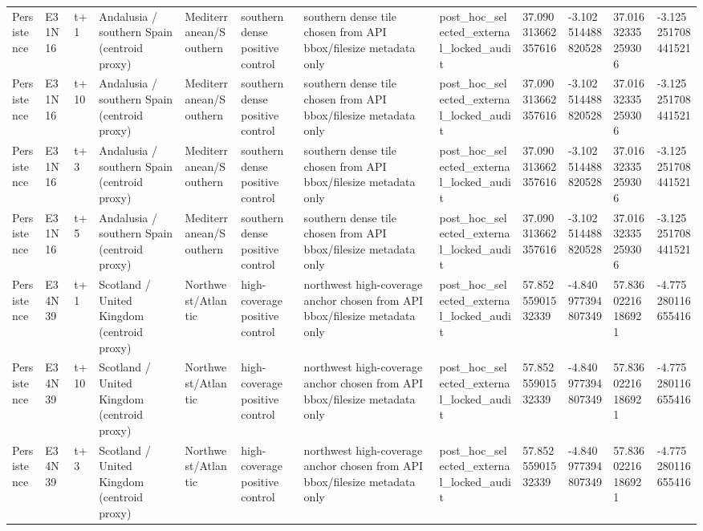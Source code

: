 \begin{landscape}
\begin{longtable}{llllllllllll}
Persistence & E31N16 & t+1 & Andalusia / southern Spain (centroid proxy) & Mediterranean/Southern & southern dense positive control & southern dense tile chosen from API bbox/filesize metadata only & post\_hoc\_selected\_external\_locked\_audit & 37.090313662357616 & -3.102514488820528 & 37.01632335259306 & -3.125251708441521 \\
Persistence & E31N16 & t+10 & Andalusia / southern Spain (centroid proxy) & Mediterranean/Southern & southern dense positive control & southern dense tile chosen from API bbox/filesize metadata only & post\_hoc\_selected\_external\_locked\_audit & 37.090313662357616 & -3.102514488820528 & 37.01632335259306 & -3.125251708441521 \\
Persistence & E31N16 & t+3 & Andalusia / southern Spain (centroid proxy) & Mediterranean/Southern & southern dense positive control & southern dense tile chosen from API bbox/filesize metadata only & post\_hoc\_selected\_external\_locked\_audit & 37.090313662357616 & -3.102514488820528 & 37.01632335259306 & -3.125251708441521 \\
Persistence & E31N16 & t+5 & Andalusia / southern Spain (centroid proxy) & Mediterranean/Southern & southern dense positive control & southern dense tile chosen from API bbox/filesize metadata only & post\_hoc\_selected\_external\_locked\_audit & 37.090313662357616 & -3.102514488820528 & 37.01632335259306 & -3.125251708441521 \\
Persistence & E34N39 & t+1 & Scotland / United Kingdom (centroid proxy) & Northwest/Atlantic & high-coverage positive control & northwest high-coverage anchor chosen from API bbox/filesize metadata only & post\_hoc\_selected\_external\_locked\_audit & 57.85255901532339 & -4.840977394807349 & 57.83602216186921 & -4.775280116655416 \\
Persistence & E34N39 & t+10 & Scotland / United Kingdom (centroid proxy) & Northwest/Atlantic & high-coverage positive control & northwest high-coverage anchor chosen from API bbox/filesize metadata only & post\_hoc\_selected\_external\_locked\_audit & 57.85255901532339 & -4.840977394807349 & 57.83602216186921 & -4.775280116655416 \\
Persistence & E34N39 & t+3 & Scotland / United Kingdom (centroid proxy) & Northwest/Atlantic & high-coverage positive control & northwest high-coverage anchor chosen from API bbox/filesize metadata only & post\_hoc\_selected\_external\_locked\_audit & 57.85255901532339 & -4.840977394807349 & 57.83602216186921 & -4.775280116655416 \\

\end{longtable}
\end{landscape}
